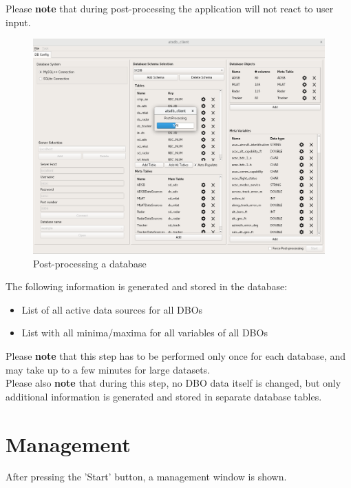 \documentclass[10pt,letterpaper,extrafontsizes]{memoir}
\begin{document}
Please \textbf{note} that during post-processing the application will not react to user input. \\


\begin{figure}[H]
  \hspace*{-2cm}
    \includegraphics[width=18cm]{../screenshots/db_postprocessing.png}
  \caption{Post-processing a database}
  \label{fig:db_postprocessing}
\end{figure}

The following information is generated and stored in the database:

\begin{itemize}  
\item List of all active data sources for all DBOs
\item List with all minima/maxima for all variables of all DBOs
\end{itemize}

Please \textbf{note} that this step has to be performed only once for each database, and may take up to a few minutes for large datasets. \\

Please also \textbf{note} that during this step, no DBO data itself is changed, but only additional information is generated and stored in separate database tables.

\section{Management}
\label{sec:management}

After pressing the 'Start' button, a management window is shown.
\end{document}
